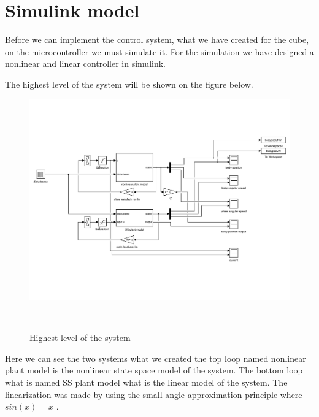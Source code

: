 \section{Simulink model}
Before we can implement the control system, what we have created for the cube, on the microcontroller we must simulate it.
For the simulation we have designed a nonlinear and linear controller in simulink.

The highest level of the system will be shown on the figure below.
\begin{figure}[H]

	
	\centering
 	\includegraphics[width=1\textwidth]{images/systemmodel.pdf}
	
	~
	\caption{Highest level of the system} 
 	\label{fig:mech} 
\end{figure}

Here we can see the two systems what we created the top loop named nonlinear plant model is the nonlinear state space model of the system.
The bottom loop what is named SS plant model what is the linear model of the system.
The linearization was made by using the small angle approximation principle where $sin(x)=x$ \cite{smallangle}.

